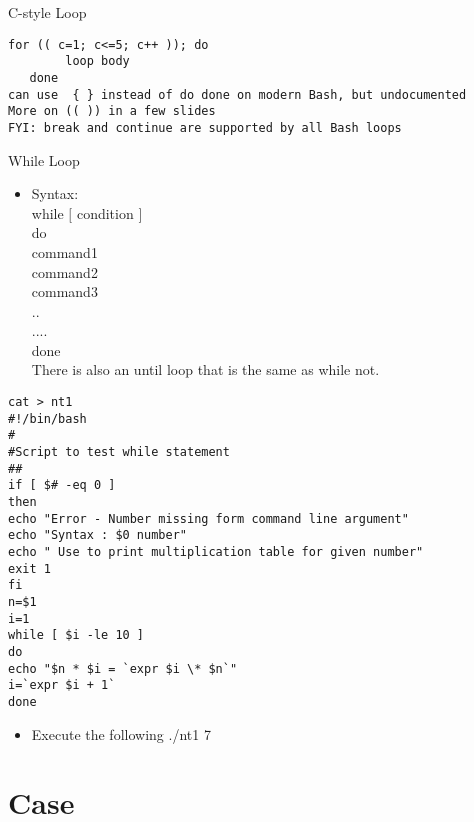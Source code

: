 \documentclass{beamer}
\begin{document}
\begin{frame}[fragile]{C-style Loop}
\begin{lstlisting}
for (( c=1; c<=5; c++ )); do
        loop body
   done
can use  { } instead of do done on modern Bash, but undocumented
More on (( )) in a few slides
FYI: break and continue are supported by all Bash loops
\end{lstlisting}
\end{frame}

\begin{frame}{While Loop}
\begin{itemize}
\item Syntax: \\
while $[$ condition $]$ \\
do \\
command1 \\
command2 \\
command3 \\
.. \\
.... \\
done \\
There is also an until loop that is the same as while not. \\
\end{itemize}
\end{frame}

\begin{frame}[fragile]{}
\begin{lstlisting}
cat > nt1
#!/bin/bash
#
#Script to test while statement
##
if [ $# -eq 0 ]
then
echo "Error - Number missing form command line argument"
echo "Syntax : $0 number"
echo " Use to print multiplication table for given number"
exit 1
fi
n=$1
i=1
while [ $i -le 10 ]
do
echo "$n * $i = `expr $i \* $n`"
i=`expr $i + 1`
done
\end{lstlisting}
\begin{itemize}
\item Execute the following
./nt1 7
\end{itemize}
\end{frame}

\section{Case}
\subsection{}
\end{document}

